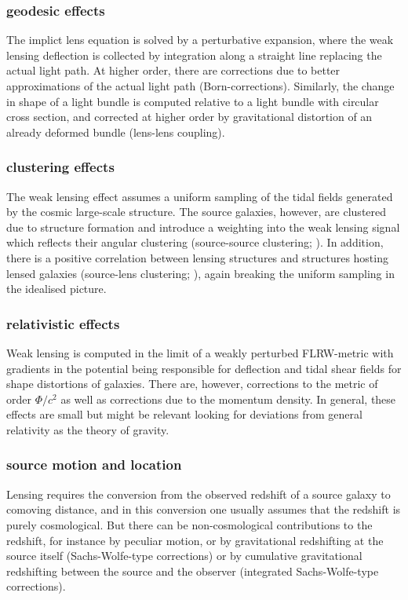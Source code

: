 \subsubsection{geodesic effects}
The implict lens equation is solved by a perturbative expansion, where the weak lensing deflection is collected by integration along a straight line replacing the actual light path. At higher order, there are corrections due to better approximations of the actual light path (Born-corrections). Similarly, the change in shape of a light bundle is computed relative to a light bundle with circular cross section, and corrected at higher order by gravitational distortion of an already deformed bundle (lens-lens coupling).


\subsubsection{clustering effects}
The weak lensing effect assumes a uniform sampling of the tidal fields generated by the cosmic large-scale structure. The source galaxies, however, are clustered due to structure formation and introduce a weighting into the weak lensing  signal which reflects their angular clustering (source-source clustering; \cite{2002A&A...389..729S}). In addition, there is a positive correlation between lensing structures and structures hosting lensed galaxies (source-lens clustering; \cite{1998A&A...338..375B}), again breaking the uniform sampling in the idealised picture.


\subsubsection{relativistic effects}
Weak lensing is computed in the limit of a weakly perturbed FLRW-metric with gradients in the potential being responsible for deflection and tidal shear fields for shape distortions of galaxies. There are, however, corrections to the metric of order $\Phi/c^2$ as well as corrections due to the momentum density. In general, these effects are small but might be relevant looking for deviations from general relativity as the theory of gravity.


\subsubsection{source motion and location}
Lensing requires the conversion from the observed redshift of a source galaxy to comoving distance, and in this conversion one usually assumes that the redshift is purely cosmological. But there can be non-cosmological contributions to the redshift, for instance by peculiar motion, or by gravitational redshifting at the source itself (Sachs-Wolfe-type corrections) or by cumulative gravitational redshifting between the source and the observer (integrated Sachs-Wolfe-type corrections).

